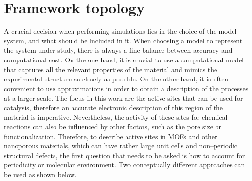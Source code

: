 \section{Framework topology}
A crucial decision when performing simulations lies in the choice of the model system, and what should be included in it. When choosing a model to represent the system under study, there is always a fine balance between accuracy and computational cost. 
On the one hand, it is crucial to use a computational model that captures all the relevant properties of the material and mimics the experimental structure as closely as possible. On the other hand, it is often convenient to use approximations in order to obtain a description of the processes at a larger scale. The focus in this work are the active sites that can be used for catalysis, therefore an accurate electronic description of this region of the material is imperative. Nevertheless, the activity of these sites for chemical reactions can also be influenced by other factors, such as the pore size or functionalization. Therefore, to describe active sites in MOFs and other nanoporous materials, which can have rather large unit cells and non--periodic structural defects, the first question that needs to be asked is how to account for periodicity or molecular environment. Two conceptually different approaches can be used as shown below.

